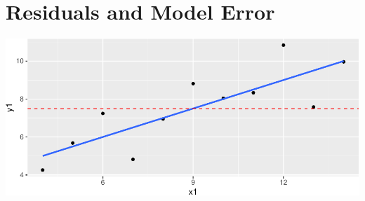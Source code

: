 \documentclass[]{article}
\begin{document}
\newpage

\hypertarget{residuals-and-model-error}{%
\section{Residuals and Model Error}\label{residuals-and-model-error}}

\includegraphics{04_in-class_files/figure-latex/smaller scatterplot with line-1.pdf}
\end{document}
